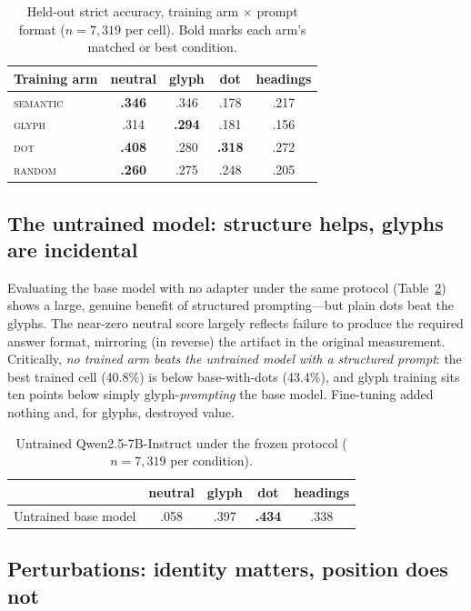\documentclass[11pt]{article}
\newcommand{\arm}[1]{\textsc{#1}}
\begin{document}
\begin{table}[h]\centering\small
\begin{tabular}{lcccc}
\toprule
Training arm & neutral & glyph & dot & headings \\
\midrule
\arm{semantic} & \textbf{.346} & .346 & .178 & .217 \\
\arm{glyph}    & .314 & \textbf{.294} & .181 & .156 \\
\arm{dot}      & \textbf{.408} & .280 & \textbf{.318} & .272 \\
\arm{random}   & \textbf{.260} & .275 & .248 & .205 \\
\bottomrule
\end{tabular}
\caption{Held-out strict accuracy, training arm $\times$ prompt format ($n=7{,}319$ per cell). Bold marks each arm's matched or best condition.}
\label{tab:main}
\end{table}

\subsection{The untrained model: structure helps, glyphs are incidental}

Evaluating the base model with no adapter under the same protocol (Table~\ref{tab:base}) shows a large, genuine benefit of structured prompting---but plain dots beat the glyphs.
The near-zero neutral score largely reflects failure to produce the required answer format, mirroring (in reverse) the artifact in the original measurement.
Critically, \emph{no trained arm beats the untrained model with a structured prompt}: the best trained cell (40.8\%) is below base-with-dots (43.4\%), and glyph training sits ten points below simply glyph-\emph{prompting} the base model.
Fine-tuning added nothing and, for glyphs, destroyed value.

\begin{table}[h]\centering\small
\begin{tabular}{lcccc}
\toprule
 & neutral & glyph & dot & headings \\
\midrule
Untrained base model & .058 & .397 & \textbf{.434} & .338 \\
\bottomrule
\end{tabular}
\caption{Untrained Qwen2.5-7B-Instruct under the frozen protocol ($n=7{,}319$ per condition).}
\label{tab:base}
\end{table}

\subsection{Perturbations: identity matters, position does not}
\end{document}
